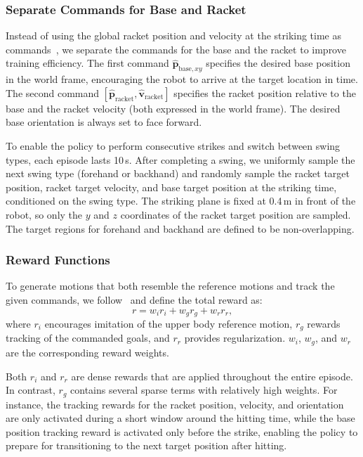 \subsubsection{Separate Commands for Base and Racket}
Instead of using the global racket position and velocity at the striking time as commands~\cite{ma2025learning}, we separate the commands for the base and the racket to improve training efficiency. The first command $\hat{\mathbf{p}}_{\mathrm{base},xy}$ specifies the desired base position in the world frame, encouraging the robot to arrive at the target location in time. The second command $[\hat{\mathbf{p}}_{\mathrm{racket}}, \hat{\mathbf{v}}_{\mathrm{racket}}]$ specifies the racket position relative to the base and the racket velocity (both expressed in the world frame). The desired base orientation is always set to face forward.

To enable the policy to perform consecutive strikes and switch between swing types, each episode lasts 10\,s. After completing a swing, we uniformly sample the next swing type (forehand or backhand) and randomly sample the racket target position, racket target velocity, and base target position at the striking time, conditioned on the swing type. The striking plane is fixed at 0.4\,m in front of the robot, so only the $y$ and $z$ coordinates of the racket target position are sampled. The target regions for forehand and backhand are defined to be non-overlapping.

\subsubsection{Reward Functions}
To generate motions that both resemble the reference motions and track the given commands, we follow~\cite{peng2018deepmimic} and define the total reward as:
\begin{equation}
    r = w_i r_i + w_g r_g + w_r r_r,
\end{equation}
where $r_i$ encourages imitation of the upper body reference motion, $r_g$ rewards tracking of the commanded goals, and $r_r$ provides regularization. $w_i$, $w_g$, and $w_r$ are the corresponding reward weights.

Both $r_i$ and $r_r$ are dense rewards that are applied throughout the entire episode.  
In contrast, $r_g$ contains several sparse terms with relatively high weights.  
For instance, the tracking rewards for the racket position, velocity, and orientation are only activated during a short window around the hitting time, while the base position tracking reward is activated only before the strike, enabling the policy to prepare for transitioning to the next target position after hitting.

